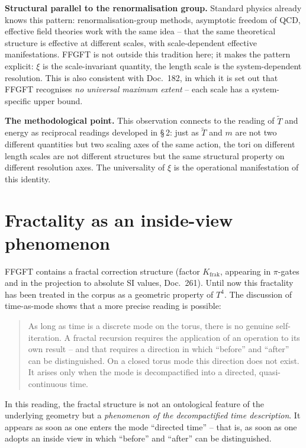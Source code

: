 \textbf{Structural parallel to the renormalisation group.} Standard
physics already knows this pattern: renormalisation-group methods,
asymptotic freedom of QCD, effective field theories work with the
same idea -- that the same theoretical structure is effective at
different scales, with scale-dependent effective manifestations.
FFGFT is not outside this tradition here; it makes the pattern
explicit: $\xi$ is the scale-invariant quantity, the length scale
is the system-dependent resolution. This is also consistent with
Doc.~182, in which it is set out that FFGFT recognises \emph{no
universal maximum extent} -- each scale has a system-specific upper
bound.

\textbf{The methodological point.} This observation connects to the
reading of $\tilde T$ and energy as reciprocal readings developed
in §\,2: just as $\tilde T$ and $m$ are not two different
quantities but two scaling axes of the same action, the tori on
different length scales are not different structures but the same
structural property on different resolution axes. The universality
of $\xi$ is the operational manifestation of this identity.

\section{Fractality as an inside-view phenomenon}

FFGFT contains a fractal correction structure (factor $K_{\text{frak}}$,
appearing in $\pi$-gates and in the projection to absolute SI values,
Doc.~261). Until now
this fractality has been treated in the corpus as a geometric
property of $T^4$. The discussion of time-as-mode shows that a more
precise reading is possible:

\begin{quote}
As long as time is a discrete mode on the torus, there is no genuine
self-iteration. A fractal recursion requires the application of an
operation to its own result -- and that requires a direction in
which ``before'' and ``after'' can be distinguished. On a closed
torus mode this direction does not exist. It arises only when the
mode is decompactified into a directed, quasi-continuous time.
\end{quote}

In this reading, the fractal structure is not an ontological feature
of the underlying geometry but a \emph{phenomenon of the
decompactified time description}. It appears as soon as one enters
the mode ``directed time'' -- that is, as soon as one adopts an
inside view in which ``before'' and ``after'' can be distinguished.

